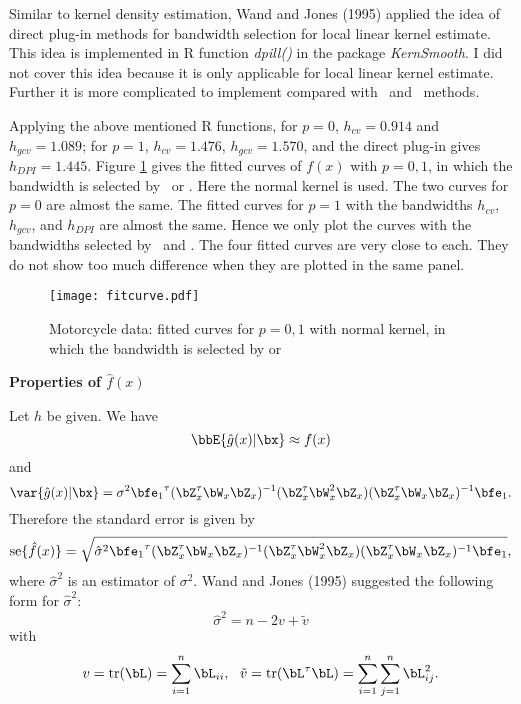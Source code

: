 Similar to kernel density estimation, Wand and Jones (1995) applied
the idea of direct plug-in methods for bandwidth selection
for local linear kernel estimate. 
This idea is implemented in R function {\it dpill()} in the package {\it KernSmooth}. 
I did not cover this idea because it is only applicable for local linear kernel estimate. 
Further it is more complicated to implement compared with  \cv\ and \gcv\ methods.  

Applying the above mentioned R functions, for $p=0$, $h_{cv}=0.914$ and $h_{gcv}=1.089$; 
for $p=1$, $h_{cv}=1.476$, $h_{gcv}=1.570$, and the direct plug-in gives $h_{DPI}=1.445$. 
Figure \ref{fitcurve} gives the fitted curves of $f(x)$ with $p=0, 1$, in which the bandwidth
is selected by \cv\ or \gcv. 
Here  the normal kernel is used. 
The two curves for $p=0$ are almost the same. 
The fitted curves for $p=1$ with  the bandwidths $h_{cv}$, $h_{gcv}$, and  $h_{DPI}$
are almost the same. Hence we only plot the curves with the bandwidths selected 
by \cv\ and \gcv. 
The four fitted curves are very close to each. 
They do not show too much difference when they are plotted in the same panel. 

\begin{figure}[p]
\caption{Motorcycle data:  fitted curves for $p=0,1$ with normal kernel, in which the bandwidth
is selected by \cv or \gcv}
\centerline{ \texttt{[image: fitcurve.pdf]}}
\label{fitcurve}
\end{figure}


\vs\vs
\noindent
{\bf Properties of $\hat f(x)$ }

Let $h$ be given. We have
\[
\bbE\{ \hat g (x)| \bx \}
\approx f(x)
\]
and
\[
\var\{\hat g(x) |\bx\}
=
\sigma^2{\bfe_1}^\tau
(\bZ^\tau_x\bW_x \bZ_x)^{-1}
(\bZ^\tau_x\bW^2_x \bZ_x)
(\bZ^\tau_x \bW_x \bZ_x)^{-1} {\bfe}_1.
\]
Therefore the standard error is given by
\[
\mbox{se}\{\hat f(x)\}
=
\sqrt{
\hat \sigma^2{\bfe_1}^\tau
(\bZ^\tau_x\bW_x \bZ_x)^{-1}
(\bZ^\tau_x\bW^2_x \bZ_x)
(\bZ^\tau_x \bW_x \bZ_x)^{-1} {\bfe}_1
},
\]
where $\hat\sigma^2$ is an estimator of $\sigma^2$. 
Wand and Jones (1995) suggested the following form for $\hat\sigma^2$: 
\[
\hat \sigma^2
=
n - 2v +\tilde v
\]
with
\[
v=\mbox{tr}(\bL)=\sum_{i=1}^n \bL_{ii},~~
\tilde v
=
\mbox{tr}(\bL^\tau \bL)=\sum_{i=1}^n \sum_{j=1}^n \bL_{ij}^2. 
\]
\clearpage

